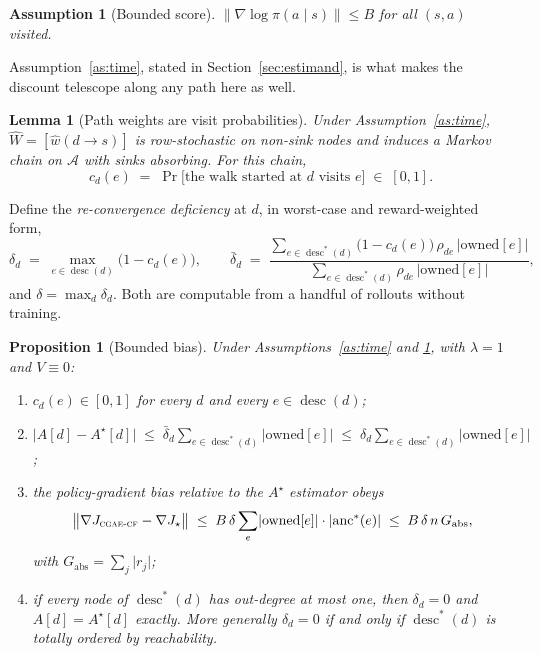\documentclass[review,authoryear,3p,times]{elsarticle}
\newtheorem{proposition}{Proposition}
\newtheorem{assumption}{Assumption}
\newtheorem{lemma}{Lemma}
\newcommand{\cflow}{\textsc{cgae-cf}}          %
\newcommand{\Ascr}{\mathcal{A}}
\newcommand{\desc}{\operatorname{desc}}
\newcommand{\anc}{\operatorname{anc}}
\begin{document}
\begin{assumption}[Bounded score]
\label{as:score}
$\lVert\nabla\log\pi(a\mid s)\rVert \le B$ for all $(s,a)$ visited.
\end{assumption}

Assumption~\ref{as:time}, stated in Section~\ref{sec:estimand}, is what makes
the discount telescope along any path here as well.

\begin{lemma}[Path weights are visit probabilities]
\label{lem:visit}
Under Assumption~\ref{as:time}, $\hat W = [\hat w(d\!\to\!s)]$ is row-stochastic
on non-sink nodes and induces a Markov chain on $\Ascr$ with sinks absorbing.
For this chain,
\[
  c_d(e) \;=\; \Pr\bigl[\text{the walk started at } d \text{ visits } e\bigr]
  \;\in\;[0,1].
\]
\end{lemma}

Define the \emph{re-convergence deficiency} at $d$, in worst-case and
reward-weighted form,
\[
  \delta_d \;=\; \max_{e\in\desc(d)}\bigl(1-c_d(e)\bigr),
  \qquad
  \bar\delta_d \;=\;
  \frac{\sum_{e\in\desc^{*}(d)}\bigl(1-c_d(e)\bigr)\,\rho_{de}\,\lvert\mathrm{owned}[e]\rvert}
       {\sum_{e\in\desc^{*}(d)}\rho_{de}\,\lvert\mathrm{owned}[e]\rvert},
\]
and $\delta=\max_d \delta_d$. Both are computable from a handful of rollouts
without training.

\begin{proposition}[Bounded bias]
\label{prop:bias}
Under Assumptions~\ref{as:time} and \ref{as:score}, with $\lambda=1$ and
$V\equiv0$:
\begin{enumerate}
\item[(i)] $c_d(e)\in[0,1]$ for every $d$ and every $e\in\desc(d)$;
\item[(ii)] $\bigl\lvert A[d]-A^\star[d]\bigr\rvert
      \;\le\; \bar\delta_d \sum_{e\in\desc^{*}(d)}\lvert\mathrm{owned}[e]\rvert
      \;\le\; \delta_d \sum_{e\in\desc^{*}(d)}\lvert\mathrm{owned}[e]\rvert$;
\item[(iii)] the policy-gradient bias relative to the $A^\star$ estimator obeys
      \[
        \bigl\lVert \nabla J_{\cflow} - \nabla J_{\star}\bigr\rVert
        \;\le\; B\,\delta \sum_{e}\lvert\mathrm{owned}[e]\rvert\cdot
                \lvert\anc^{*}(e)\rvert
        \;\le\; B\,\delta\,n\,G_{\mathrm{abs}},
      \]
      with $G_{\mathrm{abs}}=\sum_j\lvert r_j\rvert$;
\item[(iv)] if every node of $\desc^{*}(d)$ has out-degree at most one, then
      $\delta_d=0$ and $A[d]=A^\star[d]$ \emph{exactly}. More generally
      $\delta_d=0$ if and only if $\desc^{*}(d)$ is totally ordered by
      reachability.
\end{enumerate}
\end{proposition}
\end{document}
